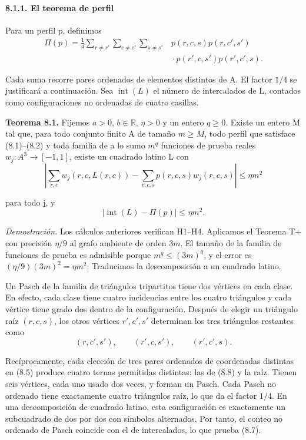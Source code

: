 \documentclass[spanish,11pt,a4paper]{article}
\begin{document}
\paragraph{8.1.1. El teorema de perfil}\label{el-teorema-de-perfil}

Para un perfil p, definimos
\[\begin{aligned}
\Pi(p)=\frac14
\sum_{r\ne r'}\sum_{c\ne c'}\sum_{s\ne s'}
&p(r,c,s)p(r,c',s')\\[-2pt]
&{}\cdot p(r',c,s')p(r',c',s).
\end{aligned}                                                       \tag{8.5}\]

Cada suma recorre pares ordenados de elementos distintos de A. El factor \(1/4\) se justificará a continuación. Sea \(\operatorname{int}(L)\) el número de intercalados de L, contados como configuraciones no ordenadas de cuatro casillas.

\textbf{Teorema 8.1.} Fijemos \(a>0\), \(b\in\mathbb R\), \(\eta>0\) y un entero \(q\geq0\). Existe un entero M tal que, para todo conjunto finito A de tamaño \(m\geq M\), todo perfil que satisface (8.1)--(8.2) y toda familia de a lo sumo \(m^q\) funciones de prueba reales \(w_j:A^3\to[-1,1]\), existe un cuadrado latino L con
\[\left|\sum_{r,c}w_j(r,c,L(r,c))-
\sum_{r,c,s}p(r,c,s)w_j(r,c,s)\right|\leq\eta m^2                  \tag{8.6}\]

para todo j, y
\[|\operatorname{int}(L)-\Pi(p)|\leq\eta m^2.                         \tag{8.7}\]

\emph{Demostración.} Los cálculos anteriores verifican H1--H4. Aplicamos el Teorema T+ con precisión \(\eta/9\) al grafo ambiente de orden \(3m\). El tamaño de la familia de funciones de prueba es admisible porque \(m^q\leq(3m)^q\), y el error es \((\eta/9)(3m)^2=\eta m^2\). Traducimos la descomposición a un cuadrado latino.

Un Pasch de la familia de triángulos tripartitos tiene dos vértices en cada clase. En efecto, cada clase tiene cuatro incidencias entre los cuatro triángulos y cada vértice tiene grado dos dentro de la configuración. Después de elegir un triángulo raíz \((r,c,s)\), los otros vértices \(r',c',s'\) determinan los tres triángulos restantes como
\[(r,c',s'),\qquad(r',c,s'),\qquad(r',c',s).                           \tag{8.8}\]

Recíprocamente, cada elección de tres pares ordenados de coordenadas distintas en (8.5) produce cuatro ternas permitidas distintas: las de (8.8) y la raíz. Tienen seis vértices, cada uno usado dos veces, y forman un Pasch. Cada Pasch no ordenado tiene exactamente cuatro triángulos raíz, lo que da el factor \(1/4\). En una descomposición de cuadrado latino, esta configuración es exactamente un subcuadrado de dos por dos con símbolos alternados. Por tanto, el conteo no ordenado de Pasch coincide con el de intercalados, lo que prueba (8.7).
\end{document}
